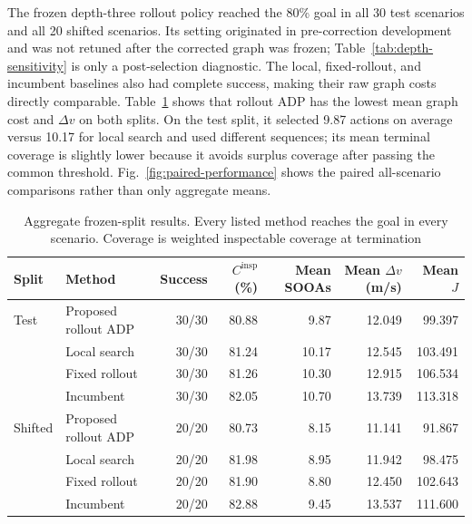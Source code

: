 \documentclass{IEEEtaes}
\theoremstyle{remark}
\theoremstyle{plain}
\begin{document}
The frozen depth-three rollout policy reached the 80\% goal in all 30 test scenarios and all 20 shifted scenarios. Its setting originated in pre-correction development and was not retuned after the corrected graph was frozen; Table~\ref{tab:depth-sensitivity} is only a post-selection diagnostic. The local, fixed-rollout, and incumbent baselines also had complete success, making their raw graph costs directly comparable. Table~\ref{tab:paired-aggregate} shows that rollout ADP has the lowest mean graph cost and $\Delta v$ on both splits. On the test split, it selected 9.87 actions on average versus 10.17 for local search and used different sequences; its mean terminal coverage is slightly lower because it avoids surplus coverage after passing the common threshold. Fig.~\ref{fig:paired-performance} shows the paired all-scenario comparisons rather than only aggregate means.

\begin{table}[t]
  \centering
  \caption{Aggregate frozen-split results. Every listed method reaches the goal in every scenario. Coverage is weighted inspectable coverage at termination}
  \label{tab:paired-aggregate}
  \renewcommand{\arraystretch}{1.06}
  \setlength{\tabcolsep}{5pt}
  \footnotesize
  \begin{tabular}{@{}llrrrrr@{}}
    \toprule
    Split & Method & Success & $C^{\mathrm{insp}}$ (\%) & Mean SOOAs & Mean $\Delta v$ (m/s) & Mean $J$ \\
    \midrule
    Test & Proposed rollout ADP & 30/30 & 80.88 & 9.87 & 12.049 & 99.397 \\
         & Local search & 30/30 & 81.24 & 10.17 & 12.545 & 103.491 \\
         & Fixed rollout & 30/30 & 81.26 & 10.30 & 12.915 & 106.534 \\
         & Incumbent & 30/30 & 82.05 & 10.70 & 13.739 & 113.318 \\
    \addlinespace
    Shifted & Proposed rollout ADP & 20/20 & 80.73 & 8.15 & 11.141 & 91.867 \\
            & Local search & 20/20 & 81.98 & 8.95 & 11.942 & 98.475 \\
            & Fixed rollout & 20/20 & 81.90 & 8.80 & 12.450 & 102.643 \\
            & Incumbent & 20/20 & 82.88 & 9.45 & 13.537 & 111.600 \\
    \bottomrule
  \end{tabular}
\end{table}
\end{document}
